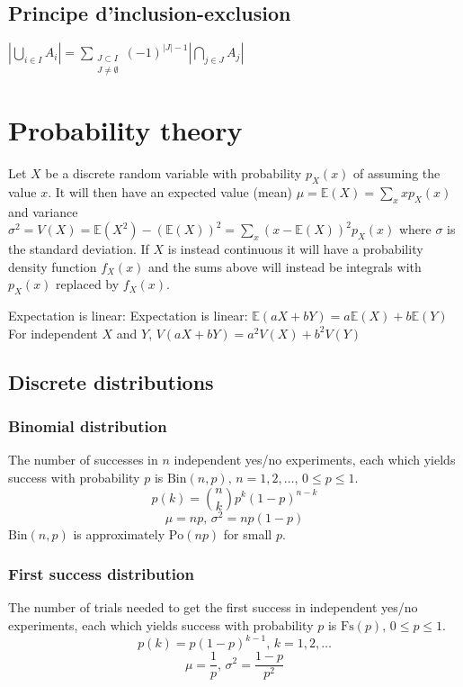     \subsection{Principe d'inclusion-exclusion}
    $ | \bigcup_{i \in I} A_i| = \sum_{\substack{J \subset I \\ J \neq \emptyset}} (-1)^{|J| - 1} |\bigcap_{j \in J} A_j| $

\section{Probability theory}
Let $X$ be a discrete random variable with probability $p_X(x)$ of assuming the value $x$. It will then have an expected value (mean) $\mu=\mathbb{E}(X)=\sum_xxp_X(x)$ and variance $\sigma^2=V(X)=\mathbb{E}(X^2)-(\mathbb{E}(X))^2=\sum_x(x-\mathbb{E}(X))^2p_X(x)$ where $\sigma$ is the standard deviation. If $X$ is instead continuous it will have a probability density function $f_X(x)$ and the sums above will instead be integrals with $p_X(x)$ replaced by $f_X(x)$.

Expectation is linear:
Expectation is linear: $\mathbb{E}(aX+bY) = a\mathbb{E}(X)+b\mathbb{E}(Y)$ \\
For independent $X$ and $Y$, $V(aX+bY) = a^2V(X)+b^2V(Y)$

\subsection{Discrete distributions}

\subsubsection{Binomial distribution}
The number of successes in $n$ independent yes/no experiments, each which yields success with probability $p$ is $\textrm{Bin}(n,p),\,n=1,2,\dots,\, 0\leq p\leq1$.
\[p(k)=\binom{n}{k}p^k(1-p)^{n-k}\]
\[\mu = np,\,\sigma^2=np(1-p)\]
$\textrm{Bin}(n,p)$ is approximately $\textrm{Po}(np)$ for small $p$.

\subsubsection{First success distribution}
The number of trials needed to get the first success in independent yes/no experiments, each which yields success with probability $p$ is $\textrm{Fs}(p),\,0\leq p\leq1$.
\[p(k)=p(1-p)^{k-1},\,k=1,2,\dots\]
\[\mu = \frac1p,\,\sigma^2=\frac{1-p}{p^2}\]

